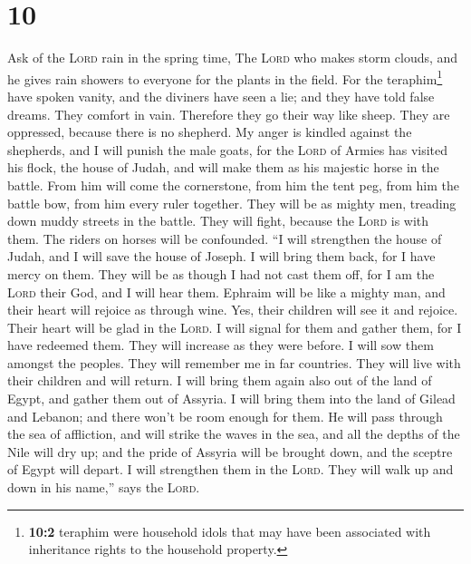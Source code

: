 \hypertarget{section-9}{%
\section{10}\label{section-9}}

 Ask of the \textsc{Lord} rain in the spring time, The
\textsc{Lord} who makes storm clouds, and he gives rain showers to
everyone for the plants in the field.  For the
teraphim\footnote{\textbf{10:2} teraphim were household idols that may
  have been associated with inheritance rights to the household
  property.} have spoken vanity, and the diviners have seen a lie; and
they have told false dreams. They comfort in vain. Therefore they go
their way like sheep. They are oppressed, because there is no shepherd.
 My anger is kindled against the shepherds, and I will
punish the male goats, for the \textsc{Lord} of Armies has visited his
flock, the house of Judah, and will make them as his majestic horse in
the battle.  From him will come the cornerstone, from him
the tent peg, from him the battle bow, from him every ruler together.
 They will be as mighty men, treading down muddy streets
in the battle. They will fight, because the \textsc{Lord} is with them.
The riders on horses will be confounded.  ``I will
strengthen the house of Judah, and I will save the house of Joseph. I
will bring them back, for I have mercy on them. They will be as though I
had not cast them off, for I am the \textsc{Lord} their God, and I will
hear them.  Ephraim will be like a mighty man, and their
heart will rejoice as through wine. Yes, their children will see it and
rejoice. Their heart will be glad in the \textsc{Lord}.  I
will signal for them and gather them, for I have redeemed them. They
will increase as they were before.  I will sow them
amongst the peoples. They will remember me in far countries. They will
live with their children and will return.  I will bring
them again also out of the land of Egypt, and gather them out of
Assyria. I will bring them into the land of Gilead and Lebanon; and
there won't be room enough for them.  He will pass
through the sea of affliction, and will strike the waves in the sea, and
all the depths of the Nile will dry up; and the pride of Assyria will be
brought down, and the sceptre of Egypt will depart.  I
will strengthen them in the \textsc{Lord}. They will walk up and down in
his name,'' says the \textsc{Lord}.

